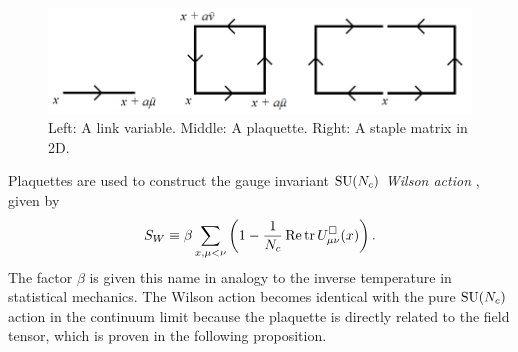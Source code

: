 \begin{figure}[t]
  \centering
  \includegraphics[width=0.9\linewidth]{figs/links.png}
  \caption{Left: A link variable. Middle: A plaquette. 
           Right: A staple matrix in 2D.}
  \label{fig:links}
\end{figure}

Plaquettes are used to construct the gauge invariant $\operatorname{SU}(N_c)$ {\it Wilson 
action} \cite{wilson_confinement_1974}, given by
\begin{equation}\label{eq:wilsonaction}\index{Wilson!action}
    S_W\equiv\beta\sum\limits_{x,\mu<\nu}\left(1
         -\frac{1}{N_c}\Re\tr U^\square_{\mu\nu}(x)\right).
\end{equation}
The factor $\beta$ is given this name in analogy to the inverse temperature 
in statistical mechanics. The Wilson action becomes identical with the
pure $\operatorname{SU}(N_c)$ action in the continuum limit because the plaquette is
directly related to the field tensor, which is proven in the following
proposition. 
\pagebreak
